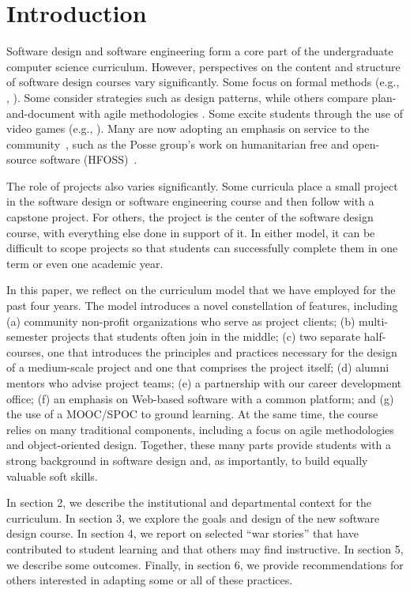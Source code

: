 
\section{Introduction}

Software design and software engineering form a core part of
the undergraduate computer science curriculum. However, perspectives
on the content and structure of software design courses vary
significantly.  Some focus on formal methods (e.g., \cite{liu-2005},
\cite{garcia-2014}).  Some consider strategies such as design
patterns, while others compare plan-and-document with agile
methodologies \cite{gestwicki-2018}.  Some excite students through
the use of video games (e.g., \cite{wolz-2007,sweedyk-2005,sweedyk-2011}).  
Many are
now adopting an emphasis on service to the community~\cite{hfoss-2018,buckley-2004,liu-2005,leidig-2006,lange-2011},
such as the Posse group's work on humanitarian free and open-source
software (HFOSS)~\cite{posse-2018}.

The role of projects also varies significantly.  Some curricula
place a small project in the software design or software engineering
course and then follow with a capstone project.  For others, the
project is the center of the software design course, with everything
else done in support of it. In either model, it can be difficult
to scope projects so that students can successfully complete them
in one term or even one academic year.

In this paper, we reflect on the curriculum model that we have
employed for the past four years.  The model introduces a novel 
constellation of features, 
including (a) community non-profit organizations who
serve as project clients; (b) multi-semester projects that students
often join in the middle; (c) two separate half-courses, one that
introduces the principles and practices necessary for the design
of a medium-scale project and one that comprises the project itself;
(d) alumni mentors who advise project teams; (e) a
partnership with our career development office; (f) an emphasis on
Web-based software with a common platform; and (g) the use of a
MOOC/SPOC to ground learning.  At the same time, the course relies
on many traditional components, including a focus on agile methodologies
and object-oriented design.  Together, these many parts provide
students with a strong background in software design and, as
importantly, to build equally valuable soft skills.

In section 2, we describe the institutional and
departmental context for the curriculum.  In section 3, we explore
the goals and design of the new software design course.  In
section 4, we report on selected ``war stories'' that have contributed
to student learning and that others may find instructive.
In section 5, we describe some outcomes.  Finally,
in section 6, we provide recommendations for others interested in
adapting some or all of these practices.

